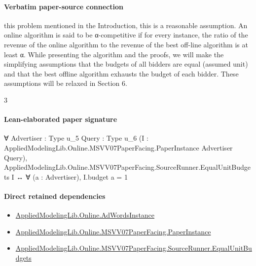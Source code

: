\documentclass[10pt]{article}
\begin{document}
\paragraph{Verbatim paper-source connection}
\begin{ReviewVerbatim}
this problem mentioned in the Introduction, this is a reasonable assumption.
An online algorithm is said to be α-competitive if for every instance, the ratio of the revenue
of the online algorithm to the revenue of the best off-line algorithm is at least α.
While presenting the algorithm and the proofs, we will make the simplifying assumptions that
the budgets of all bidders are equal (assumed unit) and that the best offline algorithm exhausts
the budget of each bidder. These assumptions will be relaxed in Section 6.

3
\end{ReviewVerbatim}



\paragraph{Lean-elaborated paper signature}
\begin{ReviewVerbatim}
∀ {Advertiser : Type u_5} {Query : Type u_6}
  (I : AppliedModelingLib.Online.MSVV07PaperFacing.PaperInstance Advertiser Query),
  AppliedModelingLib.Online.MSVV07PaperFacing.SourceRunner.EqualUnitBudgets I ↔ ∀ (a : Advertiser), I.budget a = 1
\end{ReviewVerbatim}

\paragraph{Direct retained dependencies}
\begin{itemize}\raggedright
\item \hyperlink{governing-declaration-e5ce49672bf26ab1}{Applied\allowbreak{}Modeling\allowbreak{}Lib.\allowbreak{}Online.\allowbreak{}Ad\allowbreak{}Words\allowbreak{}Instance}
\item \hyperlink{governing-declaration-11907576ec71eeb5}{Applied\allowbreak{}Modeling\allowbreak{}Lib.\allowbreak{}Online.\allowbreak{}MSVV07\allowbreak{}Paper\allowbreak{}Facing.\allowbreak{}Paper\allowbreak{}Instance}
\item \hyperlink{governing-declaration-cf74b8b54a03b174}{Applied\allowbreak{}Modeling\allowbreak{}Lib.\allowbreak{}Online.\allowbreak{}MSVV07\allowbreak{}Paper\allowbreak{}Facing.\allowbreak{}Source\allowbreak{}Runner.\allowbreak{}Equal\allowbreak{}Unit\allowbreak{}Budgets}
\end{itemize}
\end{document}
